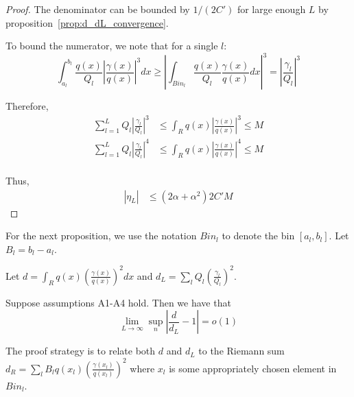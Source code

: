 \begin{proof}
The denominator can be bounded by $1/(2C')$ for large enough $L$ by proposition~\ref{prop:d_dL_convergence}.

To bound the numerator, we note that for a single $l$:
\[
\int_{a_l}^{b_l} \frac{q(x)}{Q_l} \left| \frac{\gamma(x)}{q(x)} \right|^3 dx \geq
 \left| \int_{Bin_l} \frac{q(x)}{Q_l} \frac{\gamma(x)}{q(x)} dx \right|^3 =
 \left| \frac{\gamma_l}{Q_l} \right|^3
\]

Therefore,
\begin{align*}
\sum_{l=1}^L Q_l \left| \frac{\gamma_l}{Q_l} \right|^3 &\leq \int_R q(x) \left| \frac{\gamma(x)}{q(x)} \right|^3 \leq M \\
\sum_{l=1}^L Q_l \left| \frac{\gamma_l}{Q_l} \right|^4 &\leq \int_R q(x) \left| \frac{\gamma(x)}{q(x)} \right|^4 \leq M \\
\end{align*}

Thus, 
\begin{align*}
|\eta_L| &\leq (2 \alpha + \alpha^2) 2 C' M
\end{align*}

\end{proof}



For the next proposition, we use the notation $Bin_l$ to denote the bin $[a_l, b_l]$. Let $B_l = b_l - a_l$. 

\begin{proposition}
\label{prop:d_dL_convergence}
Let $d = \int_R q(x) \left( \frac{\gamma(x)}{q(x)} \right)^2 dx$ and $d_L = \sum_l Q_l \left( \frac{\gamma_l}{Q_l} \right)^2$. 

Suppose assumptions A1-A4 hold. Then we have that
\[
\lim_{L \rightarrow \infty} \sup_n \left| \frac{d}{d_L} - 1 \right| = o(1)
\]
\end{proposition}

The proof strategy is to relate both $d$ and $d_L$ to the Riemann sum $d_R = \sum_l B_l q(x_l) \left( \frac{\gamma(x_l)}{q(x_l)} \right)^2$ where $x_l$ is some appropriately chosen element in $Bin_l$.  

